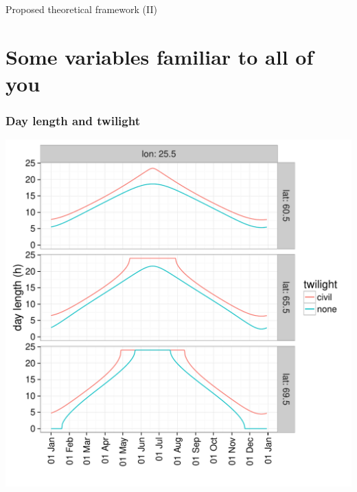 \documentclass[10pt]{beamer}\usepackage[]{graphicx}\usepackage[]{color}
\begin{document}
\begin{frame}{Proposed theoretical framework (II)}
\begin{itemize}
\end{itemize}
\end{frame}

\section{Some variables familiar to all of you}

\begin{frame}
  \frametitle{Day length and twilight}
  \centering
  \includegraphics[width=0.65\linewidth]{figures/fig-anders4.pdf}
\end{frame}
\end{document}
